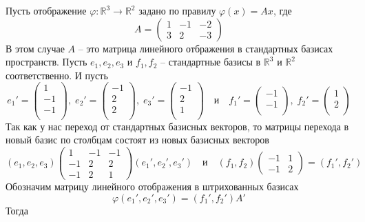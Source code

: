 \documentclass{article}
\begin{document}
Пусть отображение $\varphi \colon \mathbb R^3\to \mathbb R^2$ задано по правилу $\varphi(x) = Ax$, где
\[
A =
\begin{pmatrix}
1&-1&-2\\
3&2&-3
\end{pmatrix}
\]
В этом случае $A$ -- это матрица линейного отбражения в стандартных базисах пространств. Пусть $e_1, e_2, e_3$ и $f_1, f_2$ -- стандартные базисы в $\mathbb R^3$ и $\mathbb R^2$ соответственно. И пусть
\[
e_{{1}}' = \begin{pmatrix}
{1}\\
{-1}\\
{-1}\\
\end{pmatrix},\;e_{{2}}' = \begin{pmatrix}
{-1}\\
{2}\\
{2}\\
\end{pmatrix},\;e_{{3}}' = \begin{pmatrix}
{-1}\\
{2}\\
{1}\\
\end{pmatrix}
\quad
\text{и}
\quad
f_{{1}}' = \begin{pmatrix}
{-1}\\
{-1}\\
\end{pmatrix},\;f_{{2}}' = \begin{pmatrix}
{1}\\
{2}\\
\end{pmatrix}
\]
Так как у нас переход от стандартных базисных векторов, то матрицы перехода в новый базис по столбцам состоят из новых базисных векторов
\[
(e_1, e_2, e_3)
\begin{pmatrix}
1&-1&-1\\
-1&2&2\\
-1&2&1
\end{pmatrix}
(e_1',e_2', e_3')
\quad
\text{и}
\quad
(f_1, f_2)
\begin{pmatrix}
-1&1\\
-1&2
\end{pmatrix}
=
(f_1', f_2')
\]
Обозначим матрицу линейного отображения в штрихованных базисах
\[
\varphi(e_1', e_2', e_3') = (f_1', f_2') A'
\]
Тогда
\end{document}
